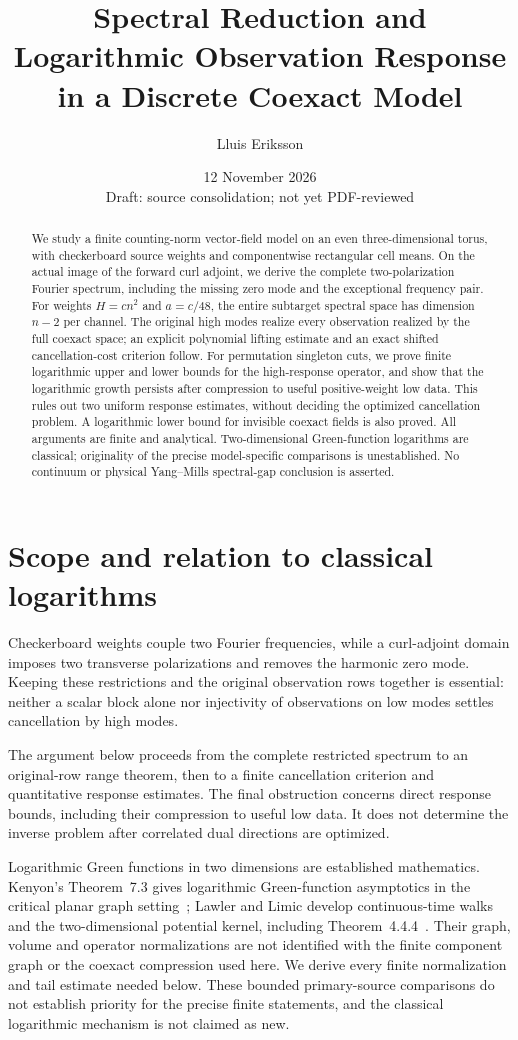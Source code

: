 \documentclass[11pt]{article}
\title{Spectral Reduction and Logarithmic Observation Response\\
in a Discrete Coexact Model}
\author{Lluis Eriksson}
\date{12 November 2026\\\small Draft: source consolidation; not yet PDF-reviewed}
\theoremstyle{definition}
\theoremstyle{remark}
\begin{document}
\maketitle
\begin{abstract}
We study a finite counting-norm vector-field model on an even three-dimensional
torus, with checkerboard source weights and componentwise rectangular cell
means. On the actual image of the forward curl adjoint, we derive the complete
two-polarization Fourier spectrum, including the missing zero mode and the
exceptional frequency pair. For weights $H=cn^2$ and $a=c/48$, the entire
subtarget spectral space has dimension $n-2$ per channel. The original high
modes realize every observation realized by the full coexact space; an
explicit polynomial lifting estimate and an exact shifted cancellation-cost
criterion follow. For permutation singleton cuts, we prove finite logarithmic
upper and lower bounds for the high-response operator, and show that the
logarithmic growth persists after compression to useful positive-weight low
data. This rules out two uniform response estimates, without deciding the
optimized cancellation problem. A logarithmic lower bound for invisible
coexact fields is also proved. All arguments are finite and analytical.
Two-dimensional Green-function logarithms are classical; originality of the
precise model-specific comparisons is unestablished. No continuum or physical
Yang--Mills spectral-gap conclusion is asserted.
\end{abstract}

\section{Scope and relation to classical logarithms}
Checkerboard weights couple two Fourier frequencies, while a curl-adjoint
domain imposes two transverse polarizations and removes the harmonic zero
mode. Keeping these restrictions and the original observation rows together
is essential: neither a scalar block alone nor injectivity of observations
on low modes settles cancellation by high modes.

The argument below proceeds from the complete restricted spectrum to an
original-row range theorem, then to a finite cancellation criterion and
quantitative response estimates. The final obstruction concerns direct
response bounds, including their compression to useful low data. It does
not determine the inverse problem after correlated dual directions are
optimized.

Logarithmic Green functions in two dimensions are established mathematics.
Kenyon's Theorem~7.3 gives logarithmic Green-function asymptotics in the
critical planar graph setting~\cite{Kenyon}; Lawler and Limic develop
continuous-time walks and the two-dimensional potential kernel, including
Theorem~4.4.4~\cite{LawlerLimic}. Their graph, volume and operator
normalizations are not identified with the finite component graph or the
coexact compression used here. We derive every finite normalization and
tail estimate needed below. These bounded primary-source comparisons do
not establish priority for the precise finite statements, and the classical
logarithmic mechanism is not claimed as new.
\end{document}

